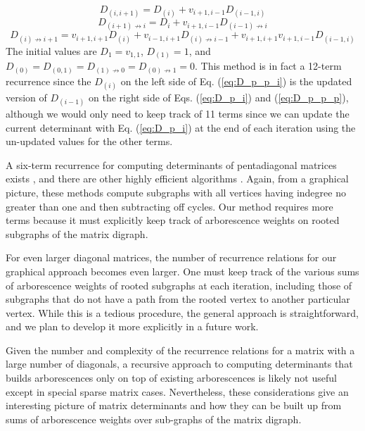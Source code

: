 \documentclass{article}
\begin{document}
\begin{equation}
    D_{(i, i+1)} = D_{(i)} + v_{i+1, i-1} D_{(i-1,i)}
\end{equation}
\begin{equation}
    D_{(i+1)\not\to i} = D_i + v_{i+1,i-1} D_{(i-1)\not\to i}
\end{equation}
\begin{equation}
    D_{(i)\not\to i+1} = v_{i+1,i+1} D_{(i)} + v_{i-1,i+1} D_{(i)\not\to i-1} + v_{i+1,i+1} v_{i+1, i-1} D_{(i-1,i)}
\end{equation}
The initial values are $D_1 = v_{1,1}$, $D_{(1)} = 1$, and $D_{(0)} = D_{(0,1)} = D_{(1)\not\to 0} = D_{(0)\not\to 1} = 0$.  This method is in fact a 12-term recurrence since the $D_{(i)}$ on the left side of Eq. (\ref{eq:D_p_p_i}) is the updated version of $D_{(i-1)}$ on the right side of Eqs. (\ref{eq:D_p_i}) and (\ref{eq:D_p_p_p}), although we would only need to keep track of 11 terms since we can update the current determinant with Eq. (\ref{eq:D_p_i}) at the end of each iteration using the un-updated values for the other terms.

A six-term recurrence for computing determinants of pentadiagonal matrices exists \cite{sweet1969recursive}, and there are other highly efficient algorithms \cite{evans1975recursive, SOGABE2008835}.  Again, from a graphical picture, these methods compute subgraphs with all vertices having indegree no greater than one and then subtracting off cycles.  Our method requires more terms because it must explicitly keep track of arborescence weights on rooted subgraphs of the matrix digraph.

For even larger diagonal matrices, the number of recurrence relations for our graphical approach becomes even larger.  One must keep track of the various sums of arborescence weights of rooted subgraphs at each iteration, including those of subgraphs that do not have a path from the rooted vertex to another particular vertex.  While this is a tedious procedure, the general approach is straightforward, and we plan to develop it more explicitly in a future work.

Given the number and complexity of the recurrence relations for a matrix with a large number of diagonals, a recursive approach to computing determinants that builds arborescences only on top of existing arborescences is likely not useful except in special sparse matrix cases.  Nevertheless, these considerations give an interesting picture of matrix determinants and how they can be built up from sums of arborescence weights over sub-graphs of the matrix digraph. 
\end{document}
